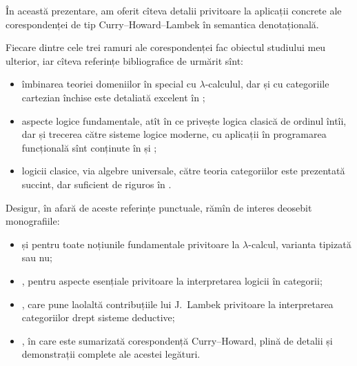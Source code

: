 \documentclass[12pt, a4paper]{article}
\begin{document}
\indent\indent În această prezentare, am oferit cîteva detalii privitoare la aplicații concrete
ale co\-res\-pon\-den\-ței de tip Curry--Howard--Lambek în semantica denotațională.

Fiecare dintre cele trei ramuri ale corespondenței fac obiectul studiului meu
ulterior, iar cîteva referințe bibliografice de urmărit sînt:
\begin{itemize}
\item îmbinarea teoriei domeniilor în special cu $\lambda$-calculul, dar și cu
  categoriile cartezian închise este detaliată excelent în \cite{amacur};
\item aspecte logice fundamentale, atît în ce privește logica clasică de ordinul
  întîi, dar și trecerea către sisteme logice moderne, cu aplicații în programarea
  funcțională sînt conținute în \cite{girlog} și \cite{girpf};
\item {} logicii clasice, via algebre universale, către teoria
  categoriilor este prezentată succint, dar suficient de riguros în \cite{pitts}.
\end{itemize}

Desigur, în afară de aceste referințe punctuale, rămîn de interes deosebit monografiile:
\begin{itemize}
\item \cite{barls} și \cite{barlt} pentru toate noțiunile fundamentale privitoare la
  $ \lambda $-calcul, varianta tipizată sau nu;
\item \cite{jac}, pentru aspecte esențiale privitoare la interpretarea logicii în categorii;
\item \cite{lascott}, care pune laolaltă contribuțiile lui J.\ Lambek privitoare la
  interpretarea categoriilor drept sisteme deductive;
\item \cite{ch}, în care este sumarizată corespondență Curry--Howard, plină de detalii
  și demonstrații complete ale acestei legături.
\end{itemize}


\newpage


\nocite{*}
\end{document}
